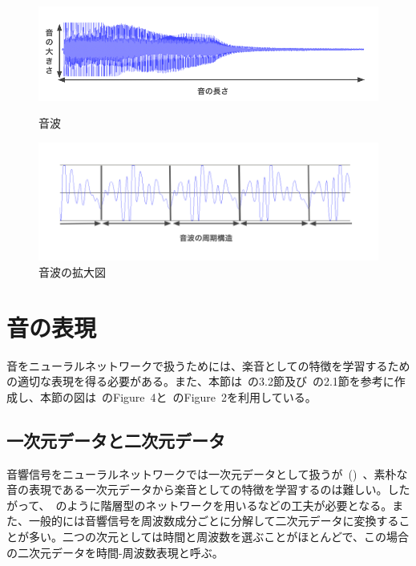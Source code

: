 \begin{figure}[b]
\centering
\begin{minipage}[b]{0.48\columnwidth}
\centering
\includegraphics[width=\columnwidth]{figure/gakuon1.png}
\caption{音波}
\label{fig:gakuon1}
\end{minipage}
\begin{minipage}[b]{0.48\columnwidth}
\centering
\includegraphics[width=\columnwidth]{figure/gakuon2.png}
\caption{音波の拡大図}
\label{fig:gakuon2}
\end{minipage}
\end{figure}

\clearpage

\section{音の表現}

音をニューラルネットワークで扱うためには、楽音としての特徴を学習するための適切な表現を得る必要がある。また、本節は~\cite{musictutorial}の3.2節及び~\cite{timbretron}の2.1節を参考に作成し、本節の図は~\cite{musictutorial}のFigure~4と~\cite{timbretron}のFigure~2を利用している。

\subsection{一次元データと二次元データ}

音響信号をニューラルネットワークでは一次元データとして扱うが~()~、素朴な音の表現である一次元データから楽音としての特徴を学習するのは難しい。したがって、~\cite{Jukebox}のように階層型のネットワークを用いるなどの工夫が必要となる。また、一般的には音響信号を周波数成分ごとに分解して二次元データに変換することが多い。二つの次元としては時間と周波数を選ぶことがほとんどで、この場合の二次元データを時間-周波数表現と呼ぶ。

